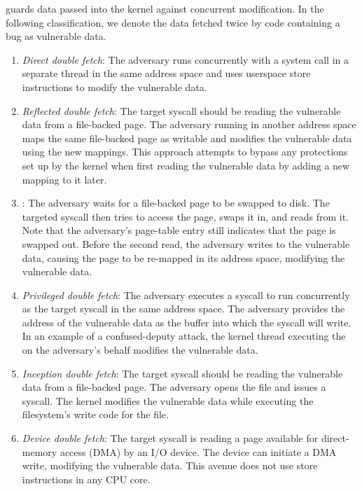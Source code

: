 \documentclass[letterpaper,twocolumn,10pt, anonymous]{article}
\begin{document}
\tiktok guards data passed into the kernel against concurrent modification.
In the following classification, we denote the data fetched twice
by code containing a \tocttou bug as vulnerable data.
\begin{enumerate}
  \item \label{attk:direct} \emph{Direct double fetch}: The adversary runs
  concurrently with a system call in a separate thread in the same address space
  and uses userspace store instructions to modify the vulnerable data.

  \item \label{attk:remapping} \emph{Reflected double fetch}: The target
  syscall should be reading the vulnerable data from a file-backed page.
  The adversary running in another address space maps the same file-backed page
  as writable and modifies the vulnerable data using the new mappings.
  This approach attempts to bypass any protections set up by the kernel
  when first reading the vulnerable data by adding a new mapping to it later.

  \item \label{attk:swap} \emph{}: The adversary
  waits for a file-backed page to be swapped to disk. 
  The targeted syscall then tries to access the page, swaps it in, and 
  reads from it. 
  Note that the adversary's page-table entry still indicates that the page
  is swapped out.
  Before the second read, the adversary writes to the vulnerable data, 
  causing the page to be re-mapped in its address space, modifying the 
  vulnerable data.

  \item \label{attk:systemcall} \emph{Privileged double fetch}: The adversary
  executes a  syscall to run concurrently as the target syscall in 
  the same address space. 
  The adversary provides the address of the vulnerable data as the buffer 
  into which the  syscall will write.
  In an example of a confused-deputy attack, the kernel thread executing the
   on the adversary's behalf modifies the vulnerable data.

  \item \label{attk:writebuffers} \emph{Inception double fetch}: The 
  target syscall should be reading the vulnerable data from a file-backed 
  page. The adversary opens the file and issues a  syscall.
  The kernel modifies the vulnerable data while executing the filesystem's
  write code for the file.

  \item \label{attk:devicefiles} \emph{Device double fetch}: The target 
  syscall is reading a page available for direct-memory access (DMA) by 
  an I/O device. The device can initiate a DMA write, modifying the 
  vulnerable data. This avenue does not use store instructions in any 
  CPU core.

\end{enumerate}
\end{document}
